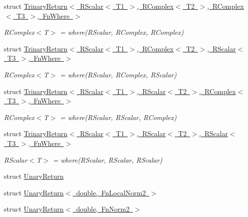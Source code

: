 \begin{DoxyCompactItemize}
struct \mbox{\hyperlink{structENSEM_1_1TrinaryReturn_3_01RScalar_3_01T1_01_4_00_01RComplex_3_01T2_01_4_00_01RComplex_3_01T3_01_4_00_01FnWhere_01_4}{Trinary\+Return$<$ R\+Scalar$<$ T1 $>$, R\+Complex$<$ T2 $>$, R\+Complex$<$ T3 $>$, Fn\+Where $>$}}
\begin{DoxyCompactList}\small\item\em R\+Complex$<$\+T$>$ = where(\+R\+Scalar, R\+Complex, R\+Complex) \end{DoxyCompactList}\item 
struct \mbox{\hyperlink{structENSEM_1_1TrinaryReturn_3_01RScalar_3_01T1_01_4_00_01RComplex_3_01T2_01_4_00_01RScalar_3_01T3_01_4_00_01FnWhere_01_4}{Trinary\+Return$<$ R\+Scalar$<$ T1 $>$, R\+Complex$<$ T2 $>$, R\+Scalar$<$ T3 $>$, Fn\+Where $>$}}
\begin{DoxyCompactList}\small\item\em R\+Complex$<$\+T$>$ = where(\+R\+Scalar, R\+Complex, R\+Scalar) \end{DoxyCompactList}\item 
struct \mbox{\hyperlink{structENSEM_1_1TrinaryReturn_3_01RScalar_3_01T1_01_4_00_01RScalar_3_01T2_01_4_00_01RComplex_3_01T3_01_4_00_01FnWhere_01_4}{Trinary\+Return$<$ R\+Scalar$<$ T1 $>$, R\+Scalar$<$ T2 $>$, R\+Complex$<$ T3 $>$, Fn\+Where $>$}}
\begin{DoxyCompactList}\small\item\em R\+Complex$<$\+T$>$ = where(\+R\+Scalar, R\+Scalar, R\+Complex) \end{DoxyCompactList}\item 
struct \mbox{\hyperlink{structENSEM_1_1TrinaryReturn_3_01RScalar_3_01T1_01_4_00_01RScalar_3_01T2_01_4_00_01RScalar_3_01T3_01_4_00_01FnWhere_01_4}{Trinary\+Return$<$ R\+Scalar$<$ T1 $>$, R\+Scalar$<$ T2 $>$, R\+Scalar$<$ T3 $>$, Fn\+Where $>$}}
\begin{DoxyCompactList}\small\item\em R\+Scalar$<$\+T$>$ = where(\+R\+Scalar, R\+Scalar, R\+Scalar) \end{DoxyCompactList}\item 
struct \mbox{\hyperlink{structENSEM_1_1UnaryReturn}{Unary\+Return}}
\item 
struct \mbox{\hyperlink{structENSEM_1_1UnaryReturn_3_01double_00_01FnLocalNorm2_01_4}{Unary\+Return$<$ double, Fn\+Local\+Norm2 $>$}}
\item 
struct \mbox{\hyperlink{structENSEM_1_1UnaryReturn_3_01double_00_01FnNorm2_01_4}{Unary\+Return$<$ double, Fn\+Norm2 $>$}}
\item 

\end{DoxyCompactItemize}
